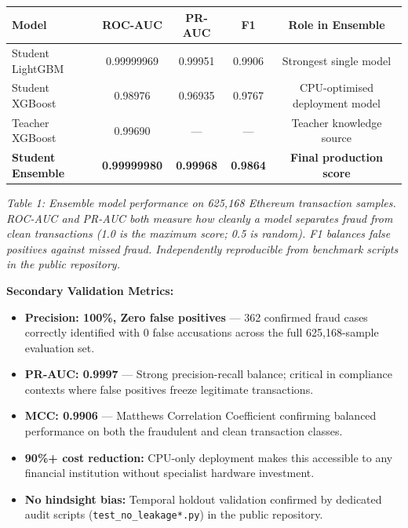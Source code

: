 \documentclass[11pt,a4paper]{article}
\begin{document}
\vspace{0.3cm}
\begin{center}
\begin{tabular}{|l|c|c|c|c|}
\hline
\textbf{Model} & \textbf{ROC-AUC} & \textbf{PR-AUC} & \textbf{F1} & \textbf{Role in Ensemble} \\
\hline
Student LightGBM & 0.99999969 & 0.99951 & 0.9906 & Strongest single model \\
Student XGBoost & 0.98976 & 0.96935 & 0.9767 & CPU-optimised deployment model \\
Teacher XGBoost & 0.99690 & --- & --- & Teacher knowledge source \\
\textbf{Student Ensemble} & \textbf{0.99999980} & \textbf{0.99968} & \textbf{0.9864} & \textbf{Final production score} \\
\hline
\end{tabular}
\end{center}
\vspace{0.05cm}
\textit{\small Table 1: Ensemble model performance on 625,168 Ethereum transaction samples. ROC-AUC and PR-AUC both measure how cleanly a model separates fraud from clean transactions (1.0 is the maximum score; 0.5 is random). F1 balances false positives against missed fraud. Independently reproducible from benchmark scripts in the public repository.}

\vspace{0.3cm}
\noindent\textbf{Secondary Validation Metrics:}
\begin{itemize}
    \item \textbf{Precision: 100\%, Zero false positives} --- 362 confirmed fraud cases correctly identified with 0 false accusations across the full 625,168-sample evaluation set.
    \item \textbf{PR-AUC: 0.9997} --- Strong precision-recall balance; critical in compliance contexts where false positives freeze legitimate transactions.
    \item \textbf{MCC: 0.9906} --- Matthews Correlation Coefficient confirming balanced performance on both the fraudulent and clean transaction classes.
    \item \textbf{90\%+ cost reduction:} CPU-only deployment makes this accessible to any financial institution without specialist hardware investment.
    \item \textbf{No hindsight bias:} Temporal holdout validation confirmed by dedicated audit scripts (\texttt{test\_no\_leakage*.py}) in the public repository.
\end{itemize}
\end{document}
